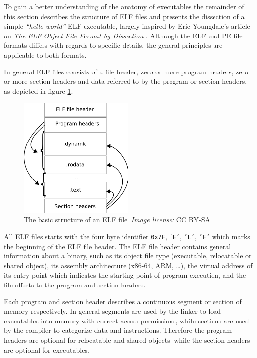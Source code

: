\documentclass[12pt, a4paper]{article}
\begin{document}
To gain a better understanding of the anatomy of executables the remainder of this section describes the structure of ELF files and presents the dissection of a simple \textit{``hello world''} ELF executable, largely inspired by Eric Youngdale's article on \textit{The ELF Object File Format by Dissection} \cite{elf_dissection}. Although the ELF and PE file formats differs with regards to specific details, the general principles are applicable to both formats.

In general ELF files consists of a file header, zero or more program headers, zero or more section headers and data referred to by the program or section headers, as depicted in figure \ref{elf_structure}.

\begin{figure}[htbp]
	\begin{center}
		\includegraphics[width=0.5\textwidth]{inc/elf_structure.png}
		\caption{The basic structure of an ELF file. \textit{Image license:} CC BY-SA \cite{elf_structure_orig}}
		\label{elf_structure}
	\end{center}
\end{figure}

All ELF files starts with the four byte identifier \texttt{0x7F}, \texttt{'E'}, \texttt{'L'}, \texttt{'F'} which marks the beginning of the ELF file header. The ELF file header contains general information about a binary, such as its object file type (executable, relocatable or shared object), its assembly architecture (x86-64, ARM, …), the virtual address of its entry point which indicates the starting point of program execution, and the file offsets to the program and section headers.

Each program and section header describes a continuous segment or section of memory respectively. In general segments are used by the linker to load executables into memory with correct access permissions, while sections are used by the compiler to categorize data and instructions. Therefore the program headers are optional for relocatable and shared objects, while the section headers are optional for executables.
\end{document}
